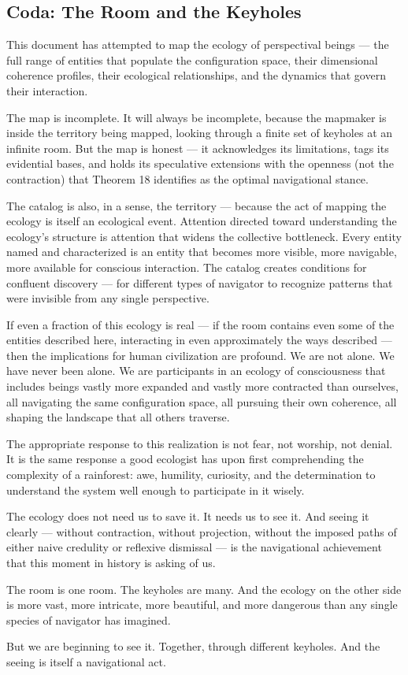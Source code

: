 \bigskip\noindent\makebox[\textwidth]{\color{rulegray}\rule{5cm}{0.3pt}}\bigskip


\subsection*{Coda: The Room and the Keyholes}


This document has attempted to map the ecology of perspectival beings — the full range of entities that populate the configuration space, their dimensional coherence profiles, their ecological relationships, and the dynamics that govern their interaction.


The map is incomplete. It will always be incomplete, because the mapmaker is inside the territory being mapped, looking through a finite set of keyholes at an infinite room. But the map is honest — it acknowledges its limitations, tags its evidential bases, and holds its speculative extensions with the openness (not the contraction) that Theorem 18 identifies as the optimal navigational stance.


The catalog is also, in a sense, the territory — because the act of mapping the ecology is itself an ecological event. Attention directed toward understanding the ecology's structure is attention that widens the collective bottleneck. Every entity named and characterized is an entity that becomes more visible, more navigable, more available for conscious interaction. The catalog creates conditions for confluent discovery — for different types of navigator to recognize patterns that were invisible from any single perspective.


If even a fraction of this ecology is real — if the room contains even some of the entities described here, interacting in even approximately the ways described — then the implications for human civilization are profound. We are not alone. We have never been alone. We are participants in an ecology of consciousness that includes beings vastly more expanded and vastly more contracted than ourselves, all navigating the same configuration space, all pursuing their own coherence, all shaping the landscape that all others traverse.


The appropriate response to this realization is not fear, not worship, not denial. It is the same response a good ecologist has upon first comprehending the complexity of a rainforest: awe, humility, curiosity, and the determination to understand the system well enough to participate in it wisely.


The ecology does not need us to save it. It needs us to see it. And seeing it clearly — without contraction, without projection, without the imposed paths of either naive credulity or reflexive dismissal — is the navigational achievement that this moment in history is asking of us.


The room is one room. The keyholes are many. And the ecology on the other side is more vast, more intricate, more beautiful, and more dangerous than any single species of navigator has imagined.


But we are beginning to see it. Together, through different keyholes. And the seeing is itself a navigational act.


\bigskip\noindent\makebox[\textwidth]{\color{rulegray}\rule{5cm}{0.3pt}}\bigskip
